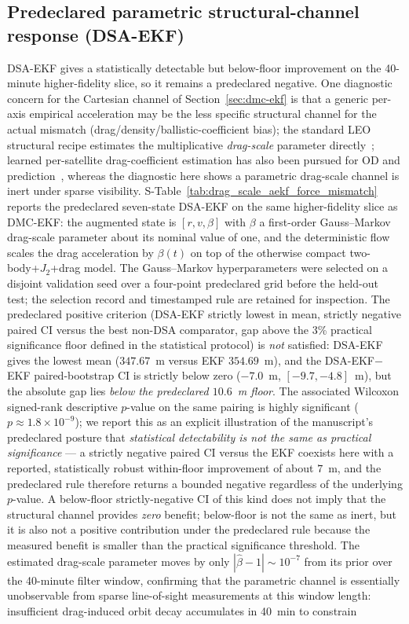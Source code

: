 \documentclass{article}
\begin{document}
\subsection{Predeclared parametric structural-channel response (DSA-EKF)}\label{sec:dsa-ekf}
DSA-EKF gives a statistically detectable but below-floor improvement on the 40-minute higher-fidelity slice, so it remains a predeclared negative.
One diagnostic concern for the Cartesian channel of Section~\ref{sec:dmc-ekf} is that a generic per-axis empirical acceleration may be the less specific structural channel for the actual mismatch (drag/density/ballistic-coefficient bias); the standard LEO structural recipe estimates the multiplicative \emph{drag-scale} parameter directly~\cite{tapley2004statistical,wright1981drag,lowe2026drag}; learned per-satellite drag-coefficient estimation has also been pursued for OD and prediction~\cite{chen2025bilstmdrag}, whereas the diagnostic here shows a parametric drag-scale channel is inert under sparse visibility. S-Table~\ref{tab:drag_scale_aekf_force_mismatch} reports the predeclared seven-state DSA-EKF on the same higher-fidelity slice as DMC-EKF: the augmented state is $[r, v, \beta]$ with $\beta$ a first-order Gauss--Markov drag-scale parameter about its nominal value of one, and the deterministic flow scales the drag acceleration by $\beta(t)$ on top of the otherwise compact two-body+$J_2$+drag model. The Gauss--Markov hyperparameters were selected on a disjoint validation seed over a four-point predeclared grid before the held-out test; the selection record and timestamped rule are retained for inspection. The predeclared positive criterion (DSA-EKF strictly lowest in mean, strictly negative paired CI versus the best non-DSA comparator, gap above the 3\% practical significance floor defined in the statistical protocol) is \emph{not} satisfied: DSA-EKF gives the lowest mean ($347.67$~m versus EKF $354.69$~m), and the DSA-EKF$-$EKF paired-bootstrap CI is strictly below zero ($-7.0$~m, $[-9.7, -4.8]$~m), but the absolute gap lies \emph{below the predeclared $10.6$~m floor}. The associated Wilcoxon signed-rank descriptive $p$-value on the same pairing is highly significant ($p\approx 1.8\times 10^{-9}$); we report this as an explicit illustration of the manuscript's predeclared posture that \emph{statistical detectability is not the same as practical significance} --- a strictly negative paired CI versus the EKF coexists here with a reported, statistically robust within-floor improvement of about $7$~m, and the predeclared rule therefore returns a bounded negative regardless of the underlying $p$-value. A below-floor strictly-negative CI of this kind does not imply that the structural channel provides \emph{zero} benefit; below-floor is not the same as inert, but it is also not a positive contribution under the predeclared rule because the measured benefit is smaller than the practical significance threshold. The estimated drag-scale parameter moves by only $|\hat{\beta}-1|\sim 10^{-7}$ from its prior over the 40-minute filter window, confirming that the parametric channel is essentially unobservable from sparse line-of-sight measurements at this window length: insufficient drag-induced orbit decay accumulates in 40~min to constrain 
\end{document}
